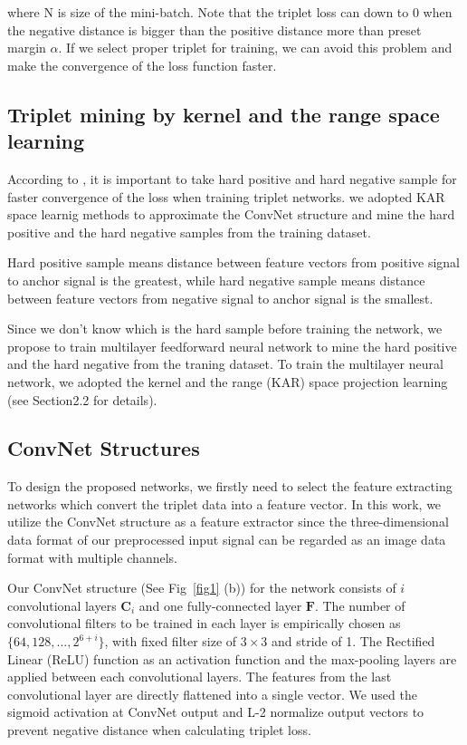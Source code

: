 \documentclass[runningheads]{llncs}
\begin{document}
where N is size of the mini-batch.
Note that the triplet loss can down to 0 when the negative distance is bigger than the positive distance more than preset margin $\alpha$.
If we select proper triplet for training, we can avoid this problem and make the convergence of the loss function faster. 

\subsection{Triplet mining by kernel and the range space learning}
According to \cite{schroff2015facenet}, it is important to take hard positive and hard negative sample for faster convergence of the loss when training triplet networks.
we adopted KAR space learnig methods to approximate the ConvNet structure and mine the hard positive and the hard negative samples from the training dataset.

Hard positive sample means distance between feature vectors from positive signal to anchor signal is the greatest, while hard negative sample means distance between feature vectors from negative signal to anchor signal is the smallest.

Since we don't know which is the hard sample before training the network, we propose to train multilayer feedforward neural network to mine the hard positive and the hard negative from the traning dataset.
To train the multilayer neural network, we adopted the kernel and the range (KAR) space projection learning (see Section2.2 for details).
\subsection{ConvNet Structures}

To design the proposed networks, we firstly need to select the feature extracting networks which convert the triplet data into a feature vector. In this work, we utilize the ConvNet structure \cite{lecun1998gradient} as a feature extractor since the three-dimensional data format of our preprocessed input signal can be regarded as an image data format with multiple channels. 

Our ConvNet structure (See Fig~\ref{fig1} (b)) for the network consists of $i$ convolutional layers $\mathbf{C}_{i}$ and one fully-connected layer $\mathbf{F}$. The number of convolutional filters to be trained in each layer is empirically chosen as $\{64, 128, ...,  2^{6+i}\}$, with fixed filter size of $3\times3$ and stride of 1. The Rectiﬁed Linear (ReLU) function as an activation function and the max-pooling layers are applied between each convolutional layers. The features from the last convolutional layer are directly flattened into a single vector.
We used the sigmoid activation at ConvNet output and L-2 normalize output vectors to prevent negative distance when calculating triplet loss.
\end{document}
